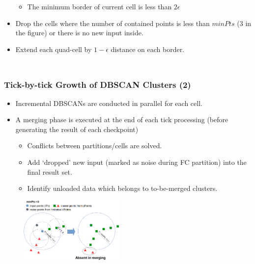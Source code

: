 \begin{frame}
\begin{columns}
\begin{itemize}
\begin{itemize}
                \item \tiny The minimum border of current cell is less than $2\epsilon$
            \end{itemize}
            \item \tiny Drop the cells where the number of contained points is less than $minPts$ (3 in the figure) or there is no new input inside.
            \item \tiny Extend each quad-cell by $1-\epsilon$ distance on each border.
        \end{itemize}
    \end{columns}
\end{frame}

\begin{frame}
    \frametitle{Tick-by-tick Growth of DBSCAN Clusters (2)}
    \begin{itemize}
	    \item Incremental DBSCANs are conducted in parallel for each cell.
	    \item A merging phase is executed at the end of each tick processing (before generating the result of each checkpoint)
	    \begin{itemize}
	        \item \small Conflicts between partitions/cells are solved.
            \item \small Add ‘dropped’ new input (marked as noise during FC partition) into the final result set.
            \item \small Identify unloaded data which belongs to to-be-merged clusters.
	    \end{itemize}
    \end{itemize}
    \begin{figure}
        \centering
        \includegraphics[width=0.46\textwidth]{resource/figures/merging-clusters.png}
    \end{figure}
\end{frame}

